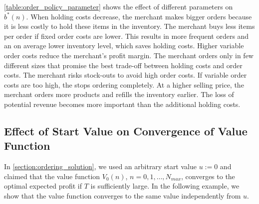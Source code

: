 \cref{table:order_policy_parameter} shows the effect of different parameters on $b^*(n)$.
When holding costs decrease, the merchant makes bigger orders because it is less costly to hold these items in the inventory.
The merchant buys less items per order if fixed order costs are lower.
This results in more frequent orders and an on average lower inventory level, which saves holding costs.
Higher variable order costs reduce the merchant's profit margin.
The merchant orders only in few different sizes that promise the best trade-off between holding costs and order costs.
The merchant risks stock-outs to avoid high order costs. 
If variable order costs are too high, the stops ordering completely.
At a higher selling price, the merchant orders more products and refills the inventory earlier.
The loss of potential revenue becomes more important than the additional holding costs.

\subsection{Effect of Start Value on Convergence of Value Function}
\label{section:convergence}
In \cref{section:ordering_solution}, we used an arbitrary start value $u := 0$ and claimed that the value function $V_0(n)$, $n=0,1,\ldots,N_{max}$, converges to the optimal expected profit if $T$ is sufficiently large.
In the following example, we show that the value function converges to the same value independently from $u$.

